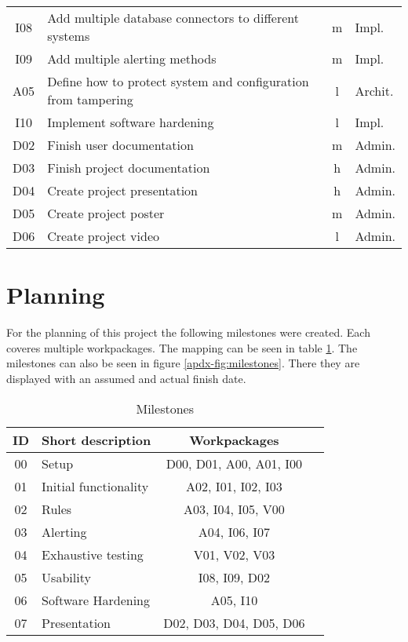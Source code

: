 \begin{table}[!ht]
\begin{center}
\begin{tabular}{c|l|c|l}
		I08 & Add multiple database connectors to different systems & m & Impl. \\
		I09 & Add multiple alerting methods & m & Impl. \\
		A05 & Define how to protect system and configuration from tampering & l & Archit. \\
		I10 & Implement software hardening & l & Impl. \\
		D02 & Finish user documentation & m & Admin. \\
		D03 & Finish project documentation & h & Admin. \\ 
		D04 & Create project presentation & h & Admin. \\
		D05 & Create project poster & m & Admin. \\
		D06 & Create project video & l & Admin. \\
    \end{tabular}
  \end{center}
\end{table}

\section{Planning}

For the planning of this project the following milestones were created. Each coveres multiple workpackages. The mapping can be seen in table \ref{tab:milestones}. The milestones can also be seen in figure \ref{apdx-fig:milestones}. There they are displayed with an assumed and actual finish date.



\begin{table}[!ht]
  \begin{center}
    \caption{Milestones}
    \label{tab:milestones}
    \begin{tabular}{c|l|c|l}
      \textbf{ID} & \textbf{Short description} & \textbf{Workpackages} \\
      \hline
			00 & Setup & D00, D01, A00, A01, I00 \\
			01 & Initial functionality & A02, I01, I02, I03 \\
			02 & Rules & A03, I04, I05, V00 \\
			03 & Alerting & A04, I06, I07 \\
			04 & Exhaustive testing & V01, V02, V03 \\
			05 & Usability & I08, I09, D02 \\
			06 & Software Hardening & A05, I10 \\
			07 & Presentation & D02, D03, D04, D05, D06 \\
    \end{tabular}
  \end{center}
\end{table}


